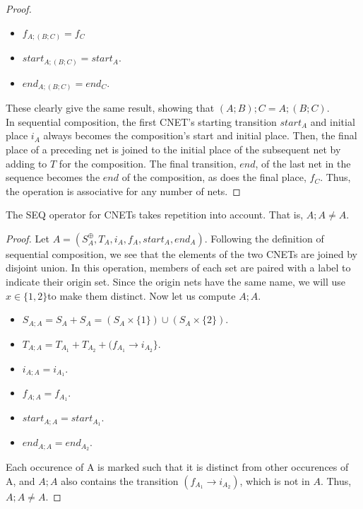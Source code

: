 \begin{proof}
\begin{itemize}
 \item $f_{A;(B;C)} = f_C$
 \item $start_{A;(B;C)} = start_A.$
 \item$ end_{A;(B;C)} = end_C. $
\end{itemize}  
These clearly give the same result, showing that $(A;B);C = A;(B;C).$ \\
In sequential composition, the first CNET's starting transition $start_A$ and initial place $i_A$ always becomes the composition's start and initial place. Then, the final place of a preceding net is joined to the initial place of the subsequent net by adding to $T$ for the composition. The final transition, $end$, of the last net in the sequence becomes the $end$ of the composition, as does the final place, $f_C$. Thus, the operation is associative for any number of nets.
\end{proof}
\begin{lemma}
\label{lemma:SEQ:REP}
The SEQ operator for CNETs takes repetition into account. That is, $A;A \neq A$.
\end{lemma}
\begin{proof}
Let $A = (S_A^\oplus, T_A, i_A, f_A, start_A, end_A)$. 
Following the definition of sequential composition, we see that the elements of the two CNETs are joined by disjoint union. In this operation, members of each set are paired with a label to indicate their origin set. Since the origin nets have the same name, we will use $x\in \{1,2\}$to make them distinct. 
Now let us compute $A;A$.
\begin{itemize}
\item $S_{A;A} = S_A + S_A = (S_A \times \{1\}) \cup (S_A \times \{2\}).$
\item $T_{A;A} = T_{A_1} + T_{A_2} + (f_{A_1} \to i_{A_2}\}$.
\item $i_{A;A} = i_{A_1}.$
\item $f_{A;A} = f_{A_1}.$
\item $start_{A;A} = start_{A_1}.$
\item $end_{A;A} = end_{A_2}. $
\end{itemize} 
Each occurence of A is marked such that it is distinct from other occurences of A, and $A;A$ also contains the transition $(f_{A_1} \to i_{A_2})$, which is not in $A$.
Thus, $A;A \neq A$.
\end{proof}   
